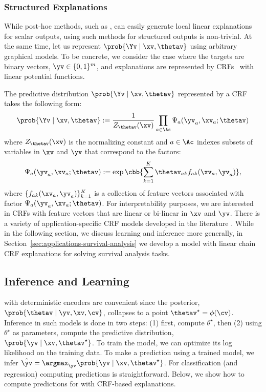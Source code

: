\documentclass[twoside,11pt]{article}
\begin{document}
\subsubsection{Structured Explanations}
\label{sec:structured-explanations}

While post-hoc methods, such as {\LIME}, can easily generate local linear explanations for scalar outputs, using such methods for structured outputs is non-trivial.
At the same time, {\CENs} let us represent $\prob{\Yv \mid \xv, \thetav}$ using arbitrary graphical models.
To be concrete, we consider the case where the targets are binary vectors, $\yv \in \{0, 1\}^{m}$, and explanations are represented by  CRFs~\citep{lafferty2001crf} with linear potential functions.

The predictive distribution $\prob{\Yv \mid \xv, \thetav}$ represented by a CRF takes the following form:
\begin{equation}
    \label{eq:generic-CRF}
    \prob{\Yv \mid \xv, \thetav} := \frac{1}{Z_{\thetav}(\xv)} \prod_{a \in \Ac} \Psi_a (\yv_a, \xv_a; \thetav)
\end{equation}
where $Z_{\thetav}(\xv)$ is the normalizing constant and $a \in \Ac$ indexes subsets of variables in $\xv$ and $\yv$ that correspond to the factors:
\begin{equation}
    \label{eq:generic-CRF-linear-factor}
    \Psi_a (\yv_a, \xv_a; \thetav) := \exp\cbb{\sum_{k=1}^K \thetav_{ak} f_{ak}(\xv_a, \yv_a)},
\end{equation}
where $\{f_{ak}(\xv_a, \yv_a)\}_{k=1}^K$ is a collection of feature vectors associated with factor $\Psi_a (\yv_a, \xv_a; \thetav)$.
For interpretability purposes, we are interested in CRFs with feature vectors that are linear or bi-linear in $\xv$ and $\yv$.
There is a variety of application-specific CRF models developed in the literature \citep[\eg, see][]{sutton2012crftutorial}.
While in the following section, we discuss learning and inference more generally, in Section~\ref{sec:applications-survival-analysis} we develop a {\CEN} model with linear chain CRF explanations for solving survival analysis tasks.


\subsection{Inference and Learning}
\label{sec:inference-and-learning}

{\CENs} with deterministic encoders are convenient since the posterior, $\prob{\thetav \mid \yv, \xv, \cv}$, collapses to a point $\thetav^\star = \phi(\cv)$.
Inference in such models is done in two steps: (1) first, compute $\theta^\star$, then (2) using $\theta^\star$ as parameters, compute the predictive distribution, $\prob{\yv \mid \xv, \thetav^\star}$.
To train the model, we can optimize its log likelihood on the training data.
To make a prediction using a trained {\CEN} model, we infer $\hat\yv = \argmax_{\yv} \prob{\yv \mid \xv, \thetav^\star}$.
For classification (and regression) computing predictions is straightforward.
Below, we show how to compute predictions for {\CEN} with CRF-based explanations.
\end{document}
